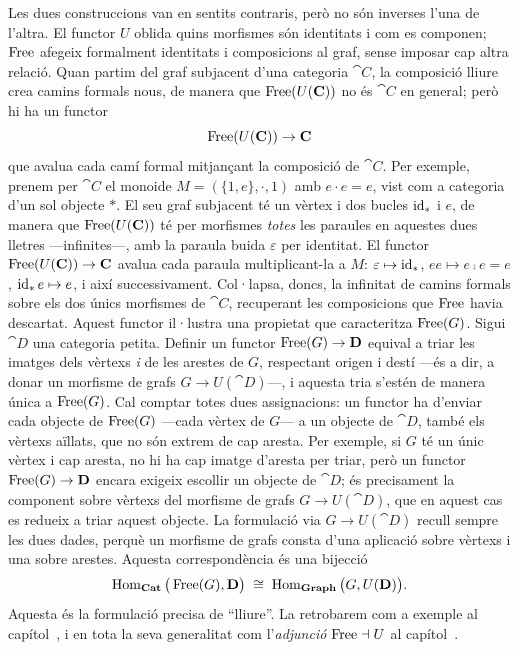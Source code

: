 Les dues construccions van en sentits contraris, però no són inverses l'una de l'altra. El functor $U$ oblida quins morfismes són identitats i com es componen; $\operatorname{Free}$ afegeix formalment identitats i composicions al graf, sense imposar cap altra relació. Quan partim del graf subjacent d'una categoria $\cat{C}$, la composició lliure crea camins formals nous, de manera que $\operatorname{Free}(U(\mathbf{C}))$ no és $\cat{C}$ en general; però hi ha un functor
\[
\operatorname{Free}(U(\mathbf{C}))\to\mathbf{C}
\]
que avalua cada camí formal mitjançant la composició de $\cat{C}$. Per exemple, prenem per $\cat{C}$ el monoide $M=(\{1,e\},\cdot,1)$ amb $e\cdot e=e$, vist com a categoria d'un sol objecte $\ast$. El seu graf subjacent té un vèrtex i dos bucles $\operatorname{id}_\ast$ i $e$, de manera que $\operatorname{Free}(U(\mathbf{C}))$ té per morfismes \emph{totes} les paraules en aquestes dues lletres ---infinites---, amb la paraula buida $\varepsilon$ per identitat. El functor $\operatorname{Free}(U(\mathbf{C}))\to\mathbf{C}$ avalua cada paraula multiplicant-la a $M$: $\varepsilon\mapsto\operatorname{id}_\ast$, $ee\mapsto e\comp e=e$, $\operatorname{id}_\ast e\mapsto e$, i així successivament. Col·lapsa, doncs, la infinitat de camins formals sobre els dos únics morfismes de $\cat{C}$, recuperant les composicions que $\operatorname{Free}$ havia descartat. Aquest functor il·lustra una propietat que caracteritza $\operatorname{Free}(G)$. Sigui $\cat{D}$ una categoria petita. Definir un functor $\operatorname{Free}(G)\to\mathbf{D}$ equival a triar les imatges dels vèrtexs \emph{i} de les arestes de $G$, respectant origen i destí ---és a dir, a donar un morfisme de grafs $G\to U(\cat{D})$---, i aquesta tria s'estén de manera única a $\operatorname{Free}(G)$. Cal comptar totes dues assignacions: un functor ha d'enviar cada objecte de $\operatorname{Free}(G)$ ---cada vèrtex de $G$--- a un objecte de $\cat{D}$, també els vèrtexs aïllats, que no són extrem de cap aresta. Per exemple, si $G$ té un únic vèrtex i cap aresta, no hi ha cap imatge d'aresta per triar, però un functor $\operatorname{Free}(G)\to\mathbf{D}$ encara exigeix escollir un objecte de $\cat{D}$; és precisament la component sobre vèrtexs del morfisme de grafs $G\to U(\cat{D})$, que en aquest cas es redueix a triar aquest objecte. La formulació via $G\to U(\cat{D})$ recull sempre les dues dades, perquè un morfisme de grafs consta d'una aplicació sobre vèrtexs i una sobre arestes. Aquesta correspondència és una bijecció
\[
\operatorname{Hom}_{\mathbf{Cat}}\big(\operatorname{Free}(G),\mathbf{D}\big)\;\cong\;\operatorname{Hom}_{\mathbf{Graph}}\big(G,U(\mathbf{D})\big).
\]
Aquesta és la formulació precisa de \enquote{lliure}. La retrobarem com a exemple al capítol~, i en tota la seva generalitat com l'\emph{adjunció} $\operatorname{Free}\dashv U$ al capítol~.

